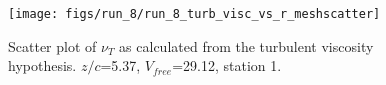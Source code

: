 \begin{figure}[H]
\centering
\texttt{[image: figs/run\_8/run\_8\_turb\_visc\_vs\_r\_meshscatter]}
\caption{Scatter plot of $\nu_T$ as calculated from the turbulent viscosity hypothesis. $z/c$=5.37, $V_{free}$=29.12, station 1.}
\label{fig:run_8_turb_visc_vs_r_meshscatter}
\end{figure}


